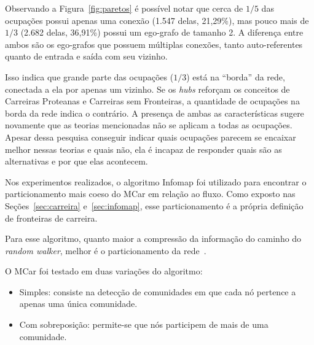 \documentclass[
  article,
  11pt,
  a4paper,
  english,
  brazil,
  sumario=tradicional]{abntex2}
\begin{document}
Observando a Figura~\ref{fig:paretos} é possível notar que cerca de $1/5$ das ocupações possui apenas uma conexão (1.547 delas, 21,29\%), mas pouco mais de $1/3$ (2.682 delas, 36,91\%) possui um ego-grafo de tamanho 2. A diferença entre ambos são os ego-grafos que possuem múltiplas conexões, tanto auto-referentes quanto de entrada e saída com seu vizinho.

Isso indica que grande parte das ocupações ($1/3$) está na \enquote{borda} da rede, conectada a ela por apenas um vizinho. Se os \textit{hubs} reforçam os conceitos de Carreiras Proteanas e Carreiras sem Fronteiras, a quantidade de ocupações na borda da rede indica o contrário. A presença de ambas as características sugere novamente que as teorias mencionadas não se aplicam a todas as ocupações. Apesar dessa pesquisa conseguir indicar quais ocupações parecem se encaixar melhor nessas teorias e quais não, ela é incapaz de responder quais são as alternativas e por que elas acontecem.


Nos experimentos realizados, o algoritmo Infomap foi utilizado para encontrar o particionamento mais coeso do MCar em relação ao fluxo. Como exposto nas Seções~\ref{sec:carreira} e~\ref{sec:infomap}, esse particionamento é a própria definição de fronteiras de carreira.

Para esse algoritmo, quanto maior a compressão da informação do caminho do \textit{random walker}, melhor é o particionamento da rede~\cite{Rosvall2009-sd}.

O MCar foi testado em duas variações do algoritmo: 
\begin{itemize}
\item Simples: consiste na detecção de comunidades em que cada nó pertence a apenas uma única comunidade. 
\item Com sobreposição: permite-se que nós participem de mais de uma comunidade.
\end{itemize}
\end{document}
